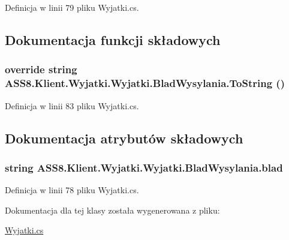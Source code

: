 Definicja w linii 79 pliku Wyjatki.cs.

\subsection{Dokumentacja funkcji składowych}
\hypertarget{a00035_25adb7508002e6766f59aaed820ec9f1}{
\subsubsection[{ToString}]{\setlength{\rightskip}{0pt plus 5cm}override string ASS8.Klient.Wyjatki.Wyjatki.BladWysylania.ToString ()}}
\label{d4/d8c/a00035_25adb7508002e6766f59aaed820ec9f1}




Definicja w linii 83 pliku Wyjatki.cs.

\subsection{Dokumentacja atrybutów składowych}
\hypertarget{a00035_a4cba0c8abed366db7c6830af13420b7}{
\subsubsection[{blad}]{\setlength{\rightskip}{0pt plus 5cm}string ASS8.Klient.Wyjatki.Wyjatki.BladWysylania.blad}}
\label{d4/d8c/a00035_a4cba0c8abed366db7c6830af13420b7}




Definicja w linii 78 pliku Wyjatki.cs.

Dokumentacja dla tej klasy została wygenerowana z pliku:\begin{CompactItemize}
\item 
\hyperlink{a00053}{Wyjatki.cs}\end{CompactItemize}
